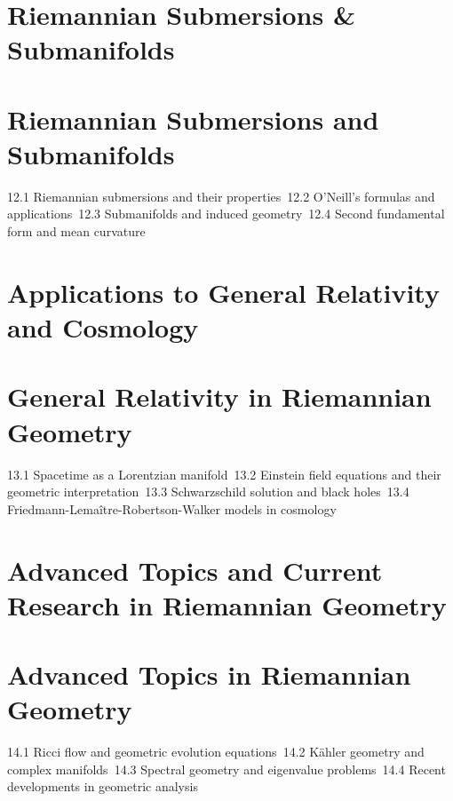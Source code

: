 \section{Riemannian Submersions \& Submanifolds}
\section{Riemannian Submersions and Submanifolds}
12.1 Riemannian submersions and their properties\
12.2 O'Neill's formulas and applications\
12.3 Submanifolds and induced geometry\
12.4 Second fundamental form and mean curvature\
\section{Applications to General Relativity and Cosmology}
\section{General Relativity in Riemannian Geometry}
13.1 Spacetime as a Lorentzian manifold\
13.2 Einstein field equations and their geometric interpretation\
13.3 Schwarzschild solution and black holes\
13.4 Friedmann-Lemaître-Robertson-Walker models in cosmology\
\section{Advanced Topics and Current Research in Riemannian Geometry}
\section{Advanced Topics in Riemannian Geometry}
14.1 Ricci flow and geometric evolution equations\
14.2 Kähler geometry and complex manifolds\
14.3 Spectral geometry and eigenvalue problems\
14.4 Recent developments in geometric analysis\
